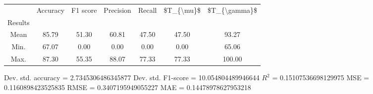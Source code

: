 \begin{tabular}{|c|c|c|c|c|c|c|}
\toprule
{} &  Accuracy &  F1 score &  Precision &  Recall &  \$T\_\{\textbackslash mu\}\$ &  \$T\_\{\textbackslash gamma\}\$ \\
Results &           &           &            &         &            &               \\
\hline
Mean    &     85.79 &     51.30 &      60.81 &   47.50 &      47.50 &         93.27 \\
Min.    &     67.07 &      0.00 &       0.00 &    0.00 &       0.00 &         65.06 \\
Max.    &     87.30 &     55.35 &      88.07 &   77.33 &      77.33 &        100.00 \\
\bottomrule
\end{tabular}

 Dev. std. accuracy = 2.7345306486345877
 Dev. std. F1-score = 10.054804489946644
 $R^2$ = 0.15107536698129975
 MSE = 0.1160898423525835
 RMSE = 0.3407195949055227
 MAE = 0.14478978627953218